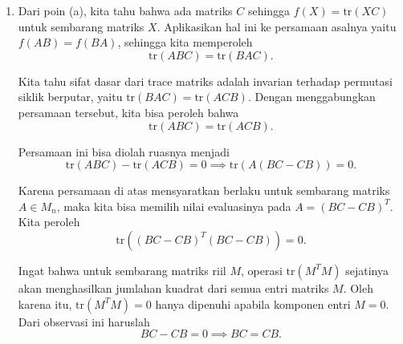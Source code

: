 \documentclass[11pt,a4paper]{article}
\begin{document}
\begin{enumerate}
\begin{enumerate}
                Agar $f(A) = \text{tr}(AC)$ terpenuhi untuk setiap matriks $A \in M_n$, kita cukup menyamakan koefisien dari $a_{ij}$ pada ruas fungsi dan ruas trace. Kita memperoleh
                \[
                  c_{ji} = f(E_{ij})
                \]
                untuk setiap $1 \le i, j \le n$. Karena $f(E_{ij})$ selalu terdefinisi untuk setiap basis matriks, maka wujud matriks $C$ tersebut selalu ada.

                Untuk membuktikan keunikannya, misalkan terdapat matriks lain $C'$ yang juga memenuhi $f(A) = \text{tr}(AC')$. Kita peroleh
                \[
                  \text{tr}(AC) = \text{tr}(AC') \implies \text{tr}(A(C - C')) = 0
                \]
                untuk setiap matriks $A \in M_n$. Jika kita pilih $A = E_{ji}$, maka $\text{tr}(E_{ji}(C - C'))$ tepat mengisolasi entri baris ke-$i$ dan kolom ke-$j$ dari matriks $C - C'$, sehingga
                \[
                  (C - C')_{ij} = 0 \implies c_{ij} = c'_{ij}.
                \]
                Karena hal ini berlaku untuk setiap $i, j$, maka haruslah $C = C'$. Jadi, matriks $C$ tersebut unik.
          \item Dari poin (a), kita tahu bahwa ada matriks $C$ sehingga $f(X) = \text{tr}(XC)$ untuk sembarang matriks $X$.
                Aplikasikan hal ini ke persamaan asalnya yaitu $f(AB) = f(BA)$, sehingga kita memperoleh
                \[
                  \text{tr}(ABC) = \text{tr}(BAC).
                \]

                Kita tahu sifat dasar dari trace matriks adalah invarian terhadap permutasi siklik berputar, yaitu $\text{tr}(BAC) = \text{tr}(ACB)$.
                Dengan menggabungkan persamaan tersebut, kita bisa peroleh bahwa
                \[
                  \text{tr}(ABC) = \text{tr}(ACB).
                \]

                Persamaan ini bisa diolah ruasnya menjadi
                \[
                  \text{tr}(ABC) - \text{tr}(ACB) = 0 \implies \text{tr}(A(BC - CB)) = 0.
                \]

                Karena persamaan di atas mensyaratkan berlaku untuk sembarang matriks $A \in M_n$, maka kita bisa memilih nilai evaluasinya pada $A = (BC - CB)^T$. Kita peroleh
                \[
                  \text{tr}((BC - CB)^T(BC - CB)) = 0.
                \]

                Ingat bahwa untuk sembarang matriks riil $M$, operasi $\text{tr}(M^TM)$ sejatinya akan menghasilkan jumlahan kuadrat dari semua entri matriks $M$. Oleh karena itu, $\text{tr}(M^TM) = 0$ hanya dipenuhi apabila komponen entri $M = 0$.
                Dari observasi ini haruslah
                \[
                  BC - CB = 0 \implies BC = CB.
                \]


\end{enumerate}
\end{enumerate}
\end{document}
